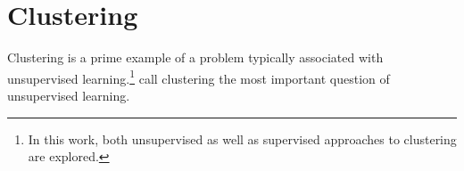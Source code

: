 \chapter{Clustering}

Clustering is a prime example of a problem typically associated with unsupervised learning.\footnote{In this work, both unsupervised as well as supervised approaches to clustering are explored.} \cite{xu_comprehensive_2015} call clustering the most important question of unsupervised learning.
